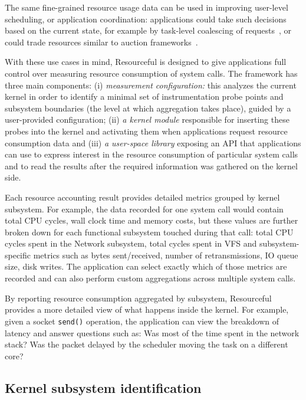 \documentclass[12pt,twoside,a4paper]{article}
\newcommand{\pname}{Resourceful}
\begin{document}
The same fine-grained resource usage data can be used in improving user-level scheduling, or application coordination: applications could take such decisions based on the current state, for example by task-level coalescing of requests~\cite{dogar2014}, or could trade resources similar to auction frameworks~\cite{ShiAuction2014}. 

With these use cases in mind, \pname{ }is designed to give applications full
control over measuring resource consumption of system calls. The framework has
three main components: (i) \textit{measurement configuration:} this analyzes the
current kernel in order to identify a minimal set of instrumentation probe
points and subsystem boundaries (the level at which aggregation takes place),
guided by a user-provided configuration; (ii) \textit{a kernel module}
responsible for inserting these probes into the kernel and activating them when
applications request resource consumption data and (iii) \textit{a user-space
library} exposing an API that applications can use to express interest in the
resource consumption of particular system calls and to read the results after
the required information was gathered on the kernel side.

Each resource accounting result provides detailed metrics grouped by kernel
subsystem. For example, the data recorded for one system call would contain
total CPU cycles, wall clock time and memory costs, but these
values are further broken down for each functional subsystem touched during that call: total
CPU cycles spent in the Network subsystem, total cycles spent in VFS and
subsystem-specific metrics such as bytes sent/received, number of
retransmissions, IO queue size, disk writes. The application can select exactly
which of those metrics are recorded and can also perform custom aggregations
across multiple system calls.

By reporting resource consumption aggregated by subsystem, Resourceful provides
a more detailed view of what happens inside the kernel. For example, given a
socket \texttt{send()} operation, the application can view the breakdown
of latency and answer questions such as: Was most of the time spent in the
network stack? Was the packet delayed by the scheduler moving the task on a
different core?

\subsection{Kernel subsystem identification}
\end{document}
